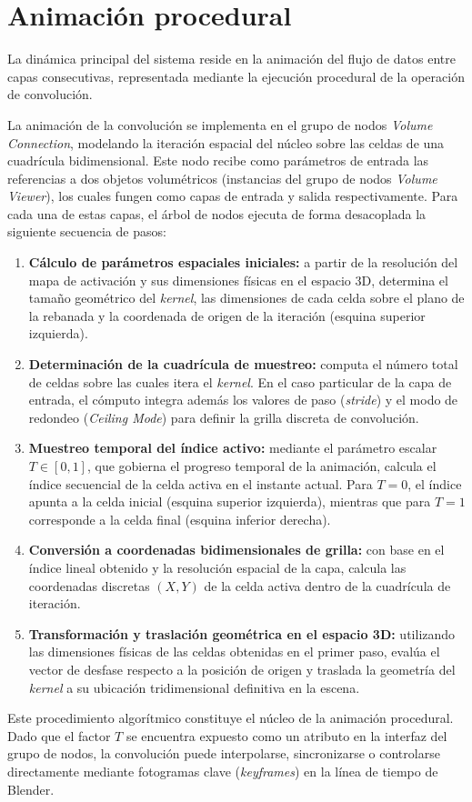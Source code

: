 \section{Animación procedural}
La dinámica principal del sistema reside en la animación del flujo de datos entre capas consecutivas, 
representada mediante la ejecución procedural de la operación de convolución.
\medskip

La animación de la convolución se implementa en el grupo de nodos \textit{Volume Connection}, modelando 
la iteración espacial del núcleo sobre las celdas de una cuadrícula bidimensional. Este nodo recibe como 
parámetros de entrada las referencias a dos objetos volumétricos (instancias del grupo de nodos 
\textit{Volume Viewer}), los cuales fungen como capas de entrada y salida respectivamente. Para cada una de estas 
capas, el árbol de nodos ejecuta de forma desacoplada la siguiente secuencia de pasos:
\begin{enumerate}
    \item \textbf{Cálculo de parámetros espaciales iniciales:} a partir de la resolución del mapa de activación y sus 
    dimensiones físicas en el espacio 3D, determina el tamaño geométrico del \textit{kernel}, las dimensiones 
    de cada celda sobre el plano de la rebanada y la coordenada de origen de la iteración (esquina superior izquierda).
    \item \textbf{Determinación de la cuadrícula de muestreo:} computa el número total de celdas sobre las 
    cuales itera el \textit{kernel}. En el caso particular de la capa de entrada, el cómputo integra además 
    los valores de paso (\textit{stride}) y el modo de redondeo (\textit{Ceiling Mode}) para definir la 
    grilla discreta de convolución.
    \item \textbf{Muestreo temporal del índice activo:} mediante el parámetro escalar $T \in [0, 1]$, que 
    gobierna el progreso temporal de la animación, calcula el índice secuencial de la celda activa en el 
    instante actual. Para $T = 0$, el índice apunta a la celda inicial (esquina superior izquierda), mientras 
    que para $T = 1$ corresponde a la celda final (esquina inferior derecha).
    \item \textbf{Conversión a coordenadas bidimensionales de grilla:} con base en el índice lineal obtenido y 
    la resolución espacial de la capa, calcula las coordenadas discretas $(X, Y)$ de la celda activa dentro de 
    la cuadrícula de iteración.
    \item \textbf{Transformación y traslación geométrica en el espacio 3D:} utilizando las dimensiones físicas 
    de las celdas obtenidas en el primer paso, evalúa el vector de desfase respecto a la posición de origen y 
    traslada la geometría del \textit{kernel} a su ubicación tridimensional definitiva en la escena.
\end{enumerate}
\medskip

Este procedimiento algorítmico constituye el núcleo de la animación procedural. Dado que el factor $T$ 
se encuentra expuesto como un atributo en la interfaz del grupo de nodos, la convolución puede interpolarse, 
sincronizarse o controlarse directamente mediante fotogramas clave (\textit{keyframes}) en la línea de tiempo de Blender.